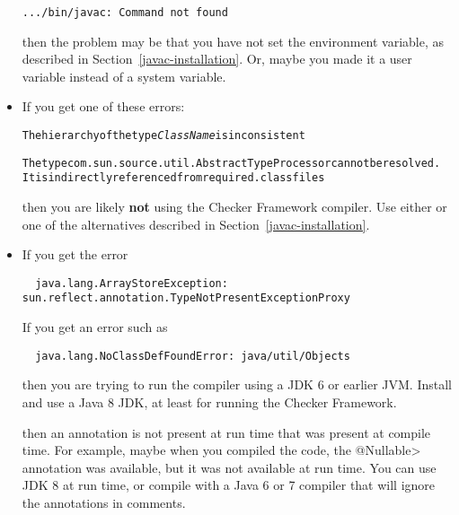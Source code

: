 \begin{itemize}
\begin{smaller}
\begin{Verbatim}
.../bin/javac: Command not found
\end{Verbatim}
\end{smaller}

\noindent
then the problem may be that you have not set the  environment
variable, as described in Section~\ref{javac-installation}.  Or, maybe
you made it a user variable instead of a system variable.

\item
If you get one of these errors:

\begin{alltt}
The hierarchy of the type \emph{ClassName} is inconsistent

The type com.sun.source.util.AbstractTypeProcessor cannot be resolved.
  It is indirectly referenced from required .class files
\end{alltt}

\begin{sloppypar}
\noindent
then you are likely \textbf{not} using the Checker Framework compiler.  Use
either  or one of the alternatives
described in Section~\ref{javac-installation}.
\end{sloppypar}


\item
If you get the error

\begin{Verbatim}
  java.lang.ArrayStoreException: sun.reflect.annotation.TypeNotPresentExceptionProxy
\end{Verbatim}

\noindent
If you get an error such as

\begin{Verbatim}
  java.lang.NoClassDefFoundError: java/util/Objects
\end{Verbatim}

\noindent
then you are trying to run the compiler using a JDK 6 or earlier JVM\@.
Install and use a Java 8
JDK, at least for running the Checker
Framework.

\noindent
then an annotation is not present at run time that was present at compile
time.  For example, maybe when you compiled the code, the \<@Nullable>
annotation was available, but it was not available at run time.
You can use JDK 8 at run time, or compile
with a Java 6 or 7 compiler that will ignore the annotations in comments.


\end{itemize}
